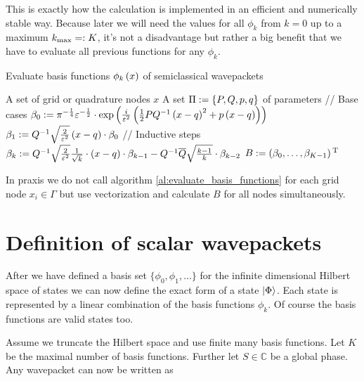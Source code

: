 This is exactly how the calculation is implemented in an efficient and numerically
stable way. Because later we will need the values for all $\phi_k$ from $k=0$
up to a maximum $k_{\text{max}}=: K$, it's not a disadvantage but rather a big benefit
that we have to evaluate all previous functions for any $\phi_k$.

\begin{algorithm}
\caption{Evaluate basis functions $\phi_k\left( x \right)$ of semiclassical wavepackets}
\label{al:evaluate_basis_functions}
\begin{algorithmic}
  \REQUIRE A set of grid or quadrature nodes $x$
  \REQUIRE A set $\Pi := \{P,Q,p,q\}$ of parameters
  \STATE // Base cases
  \STATE $\beta_0 := \pi^{-\frac{1}{4}} \varepsilon^{-\frac{1}{2}}
               \cdot \exp\left( \frac{i}{\varepsilon^2} \left(\frac{1}{2} P Q^{-1}
                               \left( x - q \right)^2
                               + p \left( x - q \right) \right)
                        \right)$
  \STATE $\beta_1 := Q^{-1} \sqrt{\frac{2}{\varepsilon^2}} \left(x-q\right) \cdot \beta_0$
  \STATE // Inductive steps
    \STATE $\beta_k := Q^{-1} \sqrt{\frac{2}{\varepsilon^2}} \frac{1}{\sqrt{k}}
                         \cdot \left(x-q\right) \cdot \beta_{k-1}
                         - Q^{-1} \overline{Q} \sqrt{\frac{k-1}{k}} \cdot \beta_{k-2}$
  \ENDFOR
  \RETURN $B := \left(\beta_0, \ldots, \beta_{K-1}\right){}^{\textnormal{T}}$
\end{algorithmic}
\end{algorithm}

In praxis we do not call algorithm \ref{al:evaluate_basis_functions} for each grid
node $x_i \in \Gamma$ but use vectorization and calculate $B$ for all nodes
simultaneously.

\section{Definition of scalar wavepackets}

After we have defined a basis set $\{\phi_0, \phi_1, \ldots\}$ for the infinite
dimensional Hilbert space of states we can now define the exact form of a state
$\Ket{\Phi}$. Each state is represented by a linear combination of the basis
functions $\phi_k$. Of course the basis functions are valid states too.

Assume we truncate the Hilbert space and use finite many basis functions. Let
$K$ be the maximal number of basis functions. Further let $S \in \mathbb{C}$ be
a global phase. Any wavepacket can now be written as

